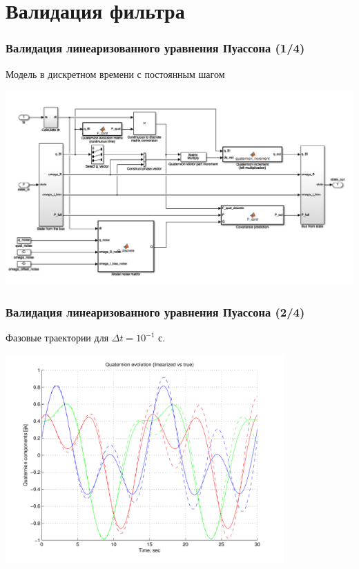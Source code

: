 \documentclass[utf8]{beamer}
\begin{document}
\section{Валидация фильтра}
\begin{frame}
\frametitle{Валидация линеаризованного уравнения Пуассона (1/4)}
Модель в дискретном времени с постоянным шагом
\begin{center}
\includegraphics[width=\textwidth]{pic/kalman_predictor.png}
\end{center}
\end{frame}
\begin{frame}
\frametitle{Валидация линеаризованного уравнения Пуассона (2/4)}
Фазовые траектории для $\Delta t = 10^{-1}$ с.
\begin{center}
\includegraphics[width=0.8\textwidth]{pic/extrapolation_01.pdf}    
\end{center}
\end{frame}
\end{document}
